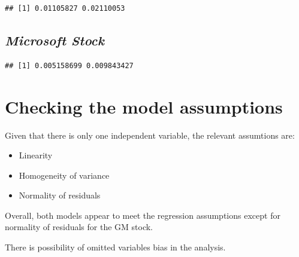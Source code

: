 \documentclass[
]{article}
\newenvironment{Shaded}{\begin{snugshade}}{\end{snugshade}}
\newcommand{\DecValTok}[1]{\textcolor[rgb]{0.00,0.00,0.81}{#1}}
\newcommand{\FloatTok}[1]{\textcolor[rgb]{0.00,0.00,0.81}{#1}}
\newcommand{\FunctionTok}[1]{\textcolor[rgb]{0.00,0.00,0.00}{#1}}
\newcommand{\NormalTok}[1]{#1}
\newcommand{\OtherTok}[1]{\textcolor[rgb]{0.56,0.35,0.01}{#1}}
\newcommand{\SpecialCharTok}[1]{\textcolor[rgb]{0.00,0.00,0.00}{#1}}
\providecommand{\tightlist}{%
  \setlength{\itemsep}{0pt}\setlength{\parskip}{0pt}}
\begin{document}
\begin{verbatim}
## [1] 0.01105827 0.02110053
\end{verbatim}

\hypertarget{microsoft-stock-2}{%
\subsection{\texorpdfstring{\textbf{\emph{Microsoft
Stock}}}{Microsoft Stock}}\label{microsoft-stock-2}}

\begin{Shaded}
\end{Shaded}

\begin{verbatim}
## [1] 0.005158699 0.009843427
\end{verbatim}

\hypertarget{checking-the-model-assumptions}{%
\section{\texorpdfstring{\textbf{Checking the model
assumptions}}{Checking the model assumptions}}\label{checking-the-model-assumptions}}

Given that there is only one independent variable, the relevant
assumtions are:

\begin{itemize}
\tightlist
\item
  Linearity
\item
  Homogeneity of variance
\item
  Normality of residuals
\end{itemize}

Overall, both models appear to meet the regression assumptions except
for normality of residuals for the GM stock.

There is possibility of omitted variables bias in the analysis.

\newpage
\end{document}
